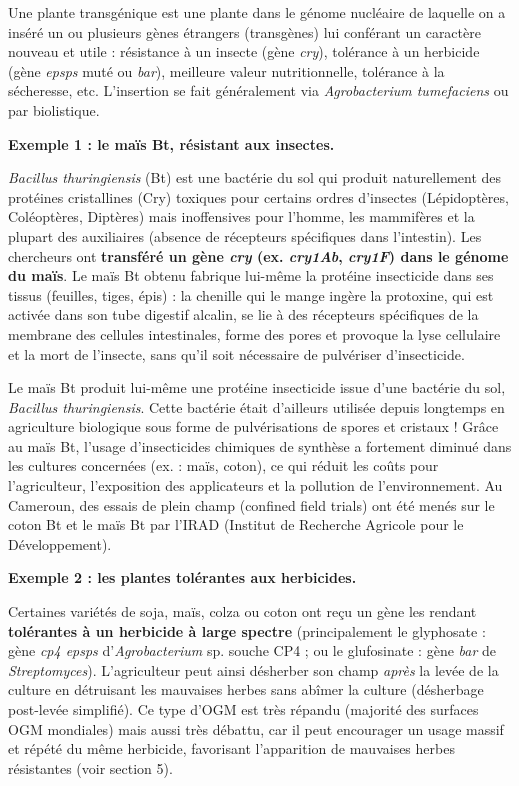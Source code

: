 \documentclass[11pt]{article}
\newcommand{\cle}[1]{{\popxbold\color{popdark}#1}}
\begin{document}
\begin{definition}
Une \cle{plante transgénique} est une plante dans le génome nucléaire de laquelle on a inséré un ou plusieurs gènes étrangers (transgènes) lui conférant un caractère nouveau et utile : résistance à un insecte (gène \emph{cry}), tolérance à un herbicide (gène \emph{epsps} muté ou \emph{bar}), meilleure valeur nutritionnelle, tolérance à la sécheresse, etc. L'insertion se fait généralement via \emph{Agrobacterium tumefaciens} ou par biolistique.
\end{definition}

\textbf{Exemple 1 : le maïs Bt, résistant aux insectes.}\par
\emph{Bacillus thuringiensis} (Bt) est une bactérie du sol qui produit naturellement des protéines cristallines (Cry) toxiques pour certains ordres d'insectes (Lépidoptères, Coléoptères, Diptères) mais inoffensives pour l'homme, les mammifères et la plupart des auxiliaires (absence de récepteurs spécifiques dans l'intestin). Les chercheurs ont \textbf{transféré un gène \emph{cry} (ex. \emph{cry1Ab}, \emph{cry1F}) dans le génome du maïs}. Le maïs Bt obtenu fabrique lui-même la protéine insecticide dans ses tissus (feuilles, tiges, épis) : la chenille qui le mange ingère la protoxine, qui est activée dans son tube digestif alcalin, se lie à des récepteurs spécifiques de la membrane des cellules intestinales, forme des pores et provoque la lyse cellulaire et la mort de l'insecte, sans qu'il soit nécessaire de pulvériser d'insecticide.

\begin{savaistu}[Le saviez-tu ?]
Le maïs Bt produit lui-même une protéine insecticide issue d'une bactérie du sol, \emph{Bacillus thuringiensis}. Cette bactérie était d'ailleurs utilisée depuis longtemps en agriculture biologique sous forme de pulvérisations de spores et cristaux ! Grâce au maïs Bt, l'usage d'insecticides chimiques de synthèse a fortement diminué dans les cultures concernées (ex. : maïs, coton), ce qui réduit les coûts pour l'agriculteur, l'exposition des applicateurs et la pollution de l'environnement. Au Cameroun, des essais de plein champ (confined field trials) ont été menés sur le coton Bt et le maïs Bt par l'IRAD (Institut de Recherche Agricole pour le Développement).
\end{savaistu}

\textbf{Exemple 2 : les plantes tolérantes aux herbicides.}\par
Certaines variétés de soja, maïs, colza ou coton ont reçu un gène les rendant \textbf{tolérantes à un herbicide à large spectre} (principalement le glyphosate : gène \emph{cp4 epsps} d'\emph{Agrobacterium} sp. souche CP4 ; ou le glufosinate : gène \emph{bar} de \emph{Streptomyces}). L'agriculteur peut ainsi désherber son champ \emph{après} la levée de la culture en détruisant les mauvaises herbes sans abîmer la culture (désherbage post-levée simplifié). Ce type d'OGM est très répandu (majorité des surfaces OGM mondiales) mais aussi très débattu, car il peut encourager un usage massif et répété du même herbicide, favorisant l'apparition de mauvaises herbes résistantes (voir section 5).
\end{document}
